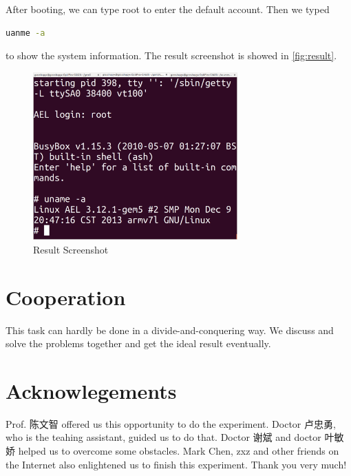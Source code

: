 \documentclass[utf8,a4paper]{article}
\begin{document}
After booting, we can type root to enter the default account. Then we typed
\begin{lstlisting}[language=bash, frame=shadowbox]
uanme -a
\end{lstlisting}
to show the system information. The result screenshot is showed in \autoref{fig:result}.
\begin{figure}[htbp]
\centering
\includegraphics[width=0.7\textwidth]{images/result.png}
\caption{Result Screenshot}\label{fig:result}
\end{figure}
	
\section{Cooperation}
This task can hardly be done in a divide-and-conquering way. We discuss and solve the problems together and get the ideal result eventually.

\section{Acknowlegements}
Prof. 陈文智 offered us this opportunity to do the experiment. Doctor 卢忠勇, who is the teahing assistant, guided us to do that. Doctor 谢斌 and doctor 叶敏娇 helped us to overcome some obstacles. Mark Chen, zxz and other friends on the Internet also enlightened us to finish this experiment. Thank you very much!
\end{document}
